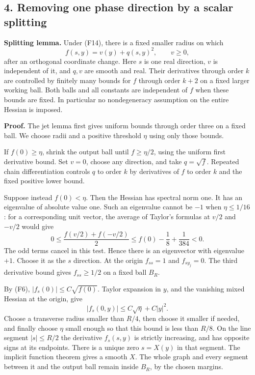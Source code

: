 \documentclass[
  11pt,
]{article}
\begin{document}
\subsection{4. Removing one phase direction by a scalar
splitting}\label{removing-one-phase-direction-by-a-scalar-splitting}

\textbf{Splitting lemma.} Under (F14), there is a fixed smaller radius
on which \[
f(s,y)=v(y)+q(s,y)^2,
\qquad v\geq0,
\tag{F17}
\] after an orthogonal coordinate change. Here \(s\) is one real
direction, \(v\) is independent of it, and \(q,v\) are smooth and real.
Their derivatives through order \(k\) are controlled by finitely many
bounds for \(f\) through order \(k+2\) on a fixed larger working ball.
Both balls and all constants are independent of \(f\) when these bounds
are fixed. In particular no nondegeneracy assumption on the entire
Hessian is imposed.

\textbf{Proof.} The jet lemma first gives uniform bounds through order
three on a fixed ball. We choose radii and a positive threshold \(\eta\)
using only those bounds.

If \(f(0)\geq\eta\), shrink the output ball until \(f\geq\eta/2\), using
the uniform first derivative bound. Set \(v=0\), choose any direction,
and take \(q=\sqrt f\). Repeated chain differentiation controls \(q\) to
order \(k\) by derivatives of \(f\) to order \(k\) and the fixed
positive lower bound.

Suppose instead \(f(0)<\eta\). Then the Hessian has spectral norm one.
It has an eigenvalue of absolute value one. Such an eigenvalue cannot be
\(-1\) when \(\eta\leq1/16\): for a corresponding unit vector, the
average of Taylor's formulas at \(v/2\) and \(-v/2\) would give \[
0\leq\frac{f(v/2)+f(-v/2)}2
\leq f(0)-\frac18+\frac1{384}<0.
\tag{F18}
\] The odd terms cancel in this test. Hence there is an eigenvector with
eigenvalue \(+1\). Choose it as the \(s\) direction. At the origin
\(f_{ss}=1\) and \(f_{sy_j}=0\). The third derivative bound gives
\(f_{ss}\geq1/2\) on a fixed ball \(B_R\).

By (F6), \(|f_s(0)|\leq C\sqrt{f(0)}\). Taylor expansion in \(y\), and
the vanishing mixed Hessian at the origin, give \[
|f_s(0,y)|\leq C\sqrt\eta+C|y|^2.
\tag{F19}
\] Choose a transverse radius smaller than \(R/4\), then choose it
smaller if needed, and finally choose \(\eta\) small enough so that this
bound is less than \(R/8\). On the line segment \(|s|\leq R/2\) the
derivative \(f_s(s,y)\) is strictly increasing, and has opposite signs
at its endpoints. There is a unique zero \(s=X(y)\) in that segment. The
implicit function theorem gives a smooth \(X\). The whole graph and
every segment between it and the output ball remain inside \(B_R\), by
the chosen margins.
\end{document}
